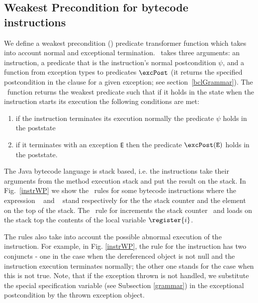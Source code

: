 \subsection{Weakest Precondition for bytecode \\instructions}\label{wpInstr}
We define a weakest precondition (\wpi) predicate transformer function which takes into account normal and exceptional termination. 
\wpi \ takes three arguments: an instruction, a predicate that is the instruction's normal postcondition $\psi$, and a function
from exception types to predicates $\excPost$ (it returns the specified postcondition in the  clause for a given exception; see section~\ref{bclGrammar}).
The \wpi \ function returns the weakest predicate such that if it holds in the state when the instruction starts its execution the following conditions are met: 
\begin{enumerate}
	\item if the instruction terminates its execution normally the predicate $\psi$ holds in the poststate 
	\item if it terminates with an exception \texttt{E} then the predicate $\excPost(\tt{E})$ holds in the poststate.
\end{enumerate}


 The Java bytecode language is stack based, i.e. the instructions take their arguments from the method execution stack and 
 put the result on the stack. In Fig.~\ref{instrWP} we show the \wpi \ rules for some bytecode instructions 
where the expression \counter~ and  \stack{\counter}~ stand respectively for the the stack counter and the element on the top of the stack. 
 The \wpi \ rule for   increments the stack counter \counter \ and loads on the stack top the contents of the local variable $\register{i}$.  %


The rules also take into account the possible abnormal execution of the instruction. For example, in Fig. \ref{instrWP}, the rule for the instruction 
has two conjuncts - one in the case when the dereferenced object is not null and the instruction execution terminates normally; the other one stands for the case when this is not true. Note, that if the exception thrown is not handled,
 we substitute the special specification variable  (see Subsection \ref{grammar}) in the exceptional postcondition by the thrown exception object.     


